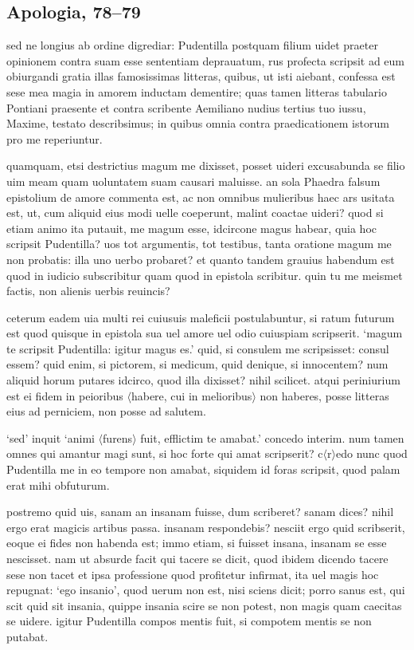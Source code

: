 \subsection*{Apologia, 78–79}

sed ne longius ab ordine digrediar: Pudentilla postquam filium uidet praeter opinionem contra suam esse sententiam deprauatum, rus profecta scripsit ad eum obiurgandi gratia illas famosissimas litteras, quibus, ut isti aiebant, confessa est sese mea magia in amorem inductam dementire; quas tamen litteras tabulario Pontiani praesente et contra scribente Aemiliano nudius tertius tuo iussu, Maxime, testato describsimus; in quibus omnia contra praedicationem istorum pro me reperiuntur. 

quamquam, etsi destrictius magum me dixisset, posset uideri excusabunda se filio uim meam quam uoluntatem suam causari maluisse. an sola Phaedra falsum epistolium de amore commenta est, ac non omnibus mulieribus haec ars usitata est, ut, cum aliquid eius modi uelle coeperunt, malint coactae uideri? quod si etiam animo ita putauit, me magum esse, idcircone magus habear, quia hoc scripsit Pudentilla? uos tot argumentis, tot testibus, tanta oratione magum me non probatis: illa uno uerbo probaret? et quanto tandem grauius habendum est quod in iudicio subscribitur quam quod in epistola scribitur. quin tu me meismet factis, non alienis uerbis reuincis? 

ceterum eadem uia multi rei cuiusuis maleficii postulabuntur, si ratum futurum est quod quisque in epistola sua uel amore uel odio cuiuspiam scripserit. `magum te scripsit Pudentilla: igitur  magus es.' quid, si consulem me scripsisset: consul essem? quid enim, si pictorem, si medicum, quid denique, si innocentem? num aliquid horum putares idcirco, quod illa dixisset? nihil scilicet. atqui periniurium est ei fidem in peioribus $\langle$habere, cui in melioribus$\rangle$ non haberes, posse litteras eius ad perniciem, non posse ad salutem. 

`sed' inquit `animi $\langle$furens$\rangle$ fuit, efflictim te amabat.' concedo interim. num tamen omnes qui amantur magi sunt, si hoc forte qui amat scripserit? c$\langle$r$\rangle$edo nunc quod Pudentilla me in eo tempore non amabat, siquidem id foras scripsit, quod palam erat mihi obfuturum. 

postremo quid uis, sanam an insanam fuisse, dum scriberet? sanam dices? nihil ergo erat magicis artibus passa. insanam respondebis? nesciit ergo quid scribserit, eoque ei fides non habenda est; immo etiam, si fuisset insana, insanam se esse nescisset. nam ut absurde facit qui tacere se dicit, quod ibidem dicendo tacere sese non tacet et ipsa professione quod profitetur infirmat, ita uel magis hoc repugnat: `ego insanio', quod uerum non est, nisi sciens dicit; porro sanus est, qui scit quid sit insania, quippe insania scire se non potest, non magis quam caecitas se uidere. igitur Pudentilla compos mentis fuit, si compotem mentis se non putabat. 

